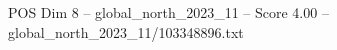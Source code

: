 \begin{textsample}{POS Dim 8 – global\_north\_2023\_11 – Score 4.00 – global\_north\_2023\_11/103348896.txt}
\end{textsample}
